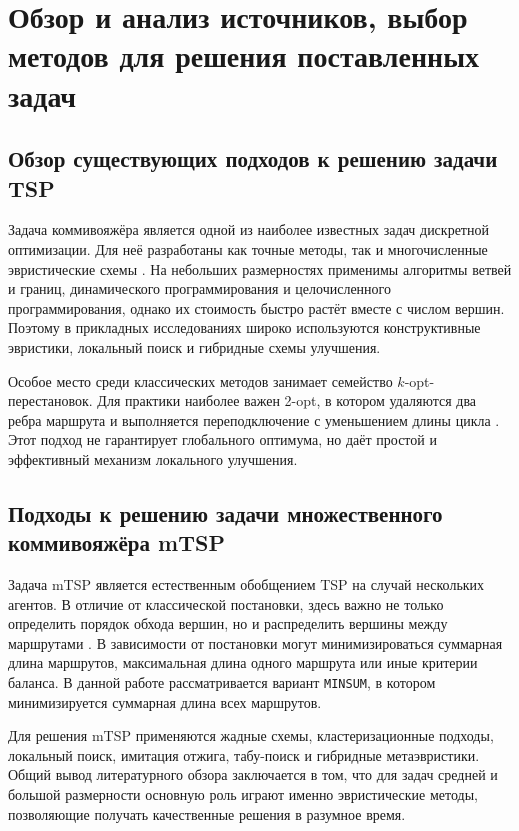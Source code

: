 \documentclass[a4paper,12pt]{article}
\begin{document}
\section{Обзор и анализ источников, выбор методов для решения поставленных задач}

\subsection{Обзор существующих подходов к решению задачи TSP}

Задача коммивояжёра является одной из наиболее известных задач дискретной оптимизации. Для неё разработаны как точные методы, так и многочисленные эвристические схемы \cite{little1963,junger1995}. На небольших размерностях применимы алгоритмы ветвей и границ, динамического программирования и целочисленного программирования, однако их стоимость быстро растёт вместе с числом вершин. Поэтому в прикладных исследованиях широко используются конструктивные эвристики, локальный поиск и гибридные схемы улучшения.

Особое место среди классических методов занимает семейство \(k\)-opt-перестановок. Для практики наиболее важен 2-opt, в котором удаляются два ребра маршрута и выполняется переподключение с уменьшением длины цикла \cite{croes1958}. Этот подход не гарантирует глобального оптимума, но даёт простой и эффективный механизм локального улучшения.

\subsection{Подходы к решению задачи множественного коммивояжёра mTSP}

Задача mTSP является естественным обобщением TSP на случай нескольких агентов. В отличие от классической постановки, здесь важно не только определить порядок обхода вершин, но и распределить вершины между маршрутами \cite{bektas2006,russell1977}. В зависимости от постановки могут минимизироваться суммарная длина маршрутов, максимальная длина одного маршрута или иные критерии баланса. В данной работе рассматривается вариант \texttt{MINSUM}, в котором минимизируется суммарная длина всех маршрутов.

Для решения mTSP применяются жадные схемы, кластеризационные подходы, локальный поиск, имитация отжига, табу-поиск и гибридные метаэвристики. Общий вывод литературного обзора заключается в том, что для задач средней и большой размерности основную роль играют именно эвристические методы, позволяющие получать качественные решения в разумное время.
\end{document}
